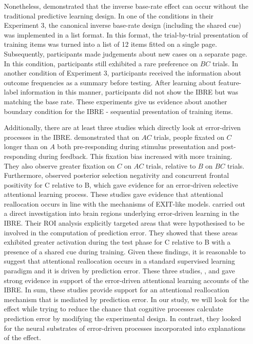 \documentclass[10pt,letterpaper]{article}
\begin{document}
Nonetheless,  demonstrated that the inverse base-rate effect can occur without the traditional predictive learning design.
In one of the conditions in their Experiment 3, the canonical inverse base-rate design (including the shared cue) was implemented in a list format.
In this format, the trial-by-trial presentation of training items was turned into a list of 12 items fitted on a single page.
Subsequently, participants made judgements about new cases on a separate page.
In this condition, participants still exhibited a rare preference on $BC$ trials.
In another condition of Experiment 3, participants received the information about outcome frequencies as a summary before testing.
After learning about feature-label information in this manner, participants did not show the IBRE but was matching the base rate.
These experiments give us evidence about another boundary condition for the IBRE - sequential presentation of training items.

Additionally, there are at least three studies which directly look at error-driven processes in the IBRE.
 demonstrated that on $AC$ trials, people fixated on $C$ longer than on $A$ both pre-responding during stimulus presentation and post-responding during feedback.
This fixation bias increased with more training.
They also observe greater fixation on $C$ on $AC$ trials, relative to $B$ on $BC$ trials.
Furthermore,  observed posterior selection negativity and concurrent frontal positivity for C relative to B, which gave evidence for an error-driven selective attentional learning process.
These studies gave evidence that attentional reallocation occurs in line with the mechanisms of EXIT-like models.
 carried out a direct investigation into brain regions underlying error-driven learning in the IBRE.
Their ROI analysis explicitly targeted areas that were hypothesised to be involved in the computation of prediction error.
They showed that these areas exhibited greater activation during the test phase for C relative to B with a presence of a shared cue during training.
Given these findings, it is reasonable to suggest that attentional reallocation occurs in a standard supervised learning paradigm and it is driven by prediction error.
These three studies, ,  and  gave strong evidence in support of the error-driven attentional learning accounts of the IBRE.
In sum, these studies provide support for an attentional reallocation mechanism that is mediated by prediction error.
In our study, we will look for the effect while trying to reduce the chance that cognitive processes calculate prediction error by modifying the experimental design.
In contrast, they looked for the neural substrates of error-driven processes incorporated into explanations of the effect.
\end{document}
